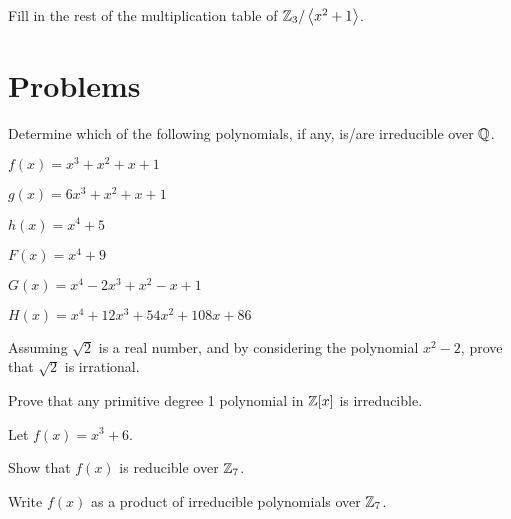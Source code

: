 \begin{exercise}\label{exercise-fill-in-missing-elements-in-table-of-Z3/<x^2+1>}
    Fill in the rest of the multiplication table of $\mathbb{Z}_3/\left\langle x^2+1\right\rangle$.
\end{exercise}
\newpage

\section{Problems}
\begin{problem}
    Determine which of the following polynomials, if any, is/are irreducible over $\mathbb{Q}$.
    \begin{multicols}{2}
        \begin{partquestions}{\alph*}
            \item $f(x) = x^3 + x^2 + x + 1$
            \item $g(x) = 6x^3 + x^2 + x + 1$
            \item $h(x) = x^4 + 5$
            \item $F(x) = x^4 + 9$
            \item $G(x) = x^4 - 2x^3 + x^2 - x + 1$
            \item $H(x) = x^4 + 12x^3 + 54x^2 + 108x + 86$
        \end{partquestions}
    \end{multicols}
\end{problem}

\begin{problem}
    Assuming $\sqrt2$ is a real number, and by considering the polynomial $x^2 - 2$, prove that $\sqrt2$ is irrational.
\end{problem}

\begin{problem}\label{problem-primitive-degree-1-polynomial-in-Z[x]-is-irreducible}
    Prove that any primitive degree 1 polynomial in $\mathbb{Z}[x]$ is irreducible.
\end{problem}

\begin{problem}
    Let $f(x) = x^3 + 6$.
    \begin{partquestions}{\roman*}
        \item Show that $f(x)$ is reducible over $\mathbb{Z}_7$.
        \item Write $f(x)$ as a product of irreducible polynomials over $\mathbb{Z}_7$.
    \end{partquestions}
\end{problem}

